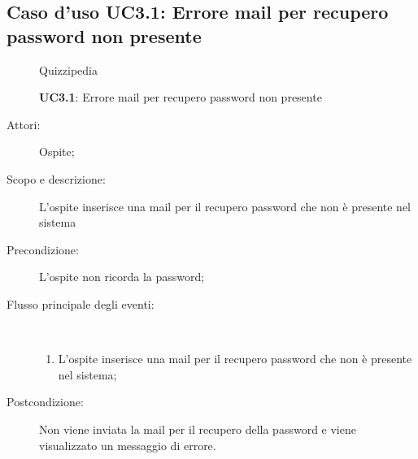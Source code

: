 \subsection{Caso d'uso UC3.1: Errore mail per recupero password non presente}
	\begin{figure}[H]
		\centering
		\begin{resizedtikzpicture}{\textwidth}
		\begin{umlsystem}[x=0, fill=lightgray!20]{Quizzipedia}
		\end{umlsystem}
		\end{resizedtikzpicture}
		\caption{\textbf{UC3.1}: Errore mail per recupero password non presente}
		\label{UC3.1}
	\end{figure}
\begin{description}
\item[Attori:] Ospite;
\item[Scopo e descrizione:] L'ospite inserisce una mail per il recupero password che non è presente nel sistema
      \item[Precondizione:] L'ospite non ricorda la password;

        \item[Flusso principale degli eventi:] \ 
 \begin{enumerate}
          \item L'ospite inserisce una mail per il recupero password che non è presente nel sistema;

      \end{enumerate}
    \item[Postcondizione:] Non viene inviata la mail per il recupero della password e viene visualizzato un messaggio di errore.
  \end{description}
\hypertarget{UC4}{}
